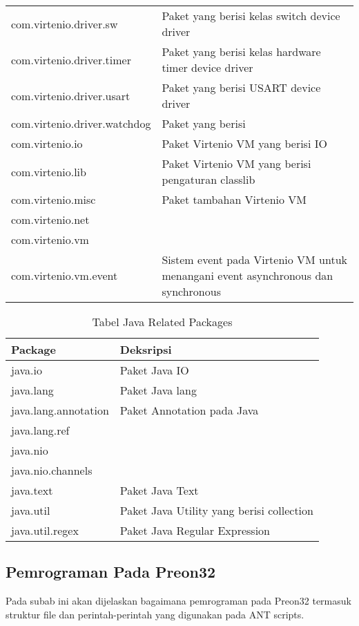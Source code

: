 \begin{table}[H]
\begin{tabular}{|p{6cm}|p{10cm}|}
		com.virtenio.driver.sw & Paket yang berisi kelas switch device driver \\
		com.virtenio.driver.timer & Paket yang berisi kelas hardware timer device driver\\
		com.virtenio.driver.usart & Paket yang berisi USART device driver\\
		com.virtenio.driver.watchdog & Paket yang berisi \\
		com.virtenio.io & Paket Virtenio VM yang berisi IO \\
		com.virtenio.lib & Paket Virtenio VM yang berisi pengaturan classlib\\
		com.virtenio.misc & Paket tambahan Virtenio VM \\
		com.virtenio.net & \\
		com.virtenio.vm & \\
		com.virtenio.vm.event & Sistem event pada Virtenio VM untuk menangani event asynchronous dan synchronous \\
		
		\hline
	\end{tabular} 
\end{table}

\begin{table}[H] %
	\centering 
	\caption{Tabel Java Related Packages}
	\label{tab:java_packages}
	\begin{tabular}{|p{6cm}|p{10cm}|}
		\hline
		Package & Deksripsi \\

		\hline
		java.io & Paket Java IO \\
		java.lang  & Paket Java lang \\
		java.lang.annotation & Paket Annotation pada Java\\
		java.lang.ref & \\
		java.nio & \\
		java.nio.channels & \\
		java.text & Paket Java Text \\
		java.util & Paket Java Utility yang berisi collection\\
		java.util.regex & Paket Java Regular Expression\\
		
		\hline
	\end{tabular} 
\end{table}	

\subsection{Pemrograman Pada Preon32}
Pada subab ini akan dijelaskan bagaimana pemrograman pada Preon32 termasuk struktur file dan perintah-perintah yang digunakan pada ANT scripts. 

